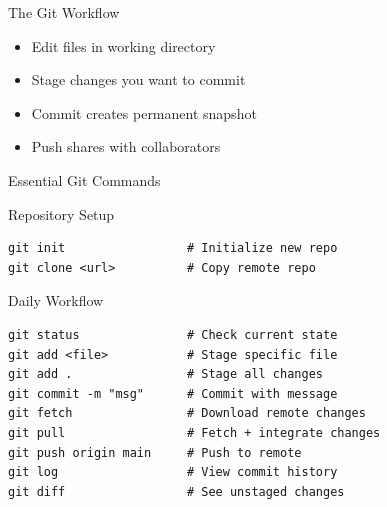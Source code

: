 \documentclass[11pt,aspectratio=169]{beamer}
\begin{document}
\begin{frame}{The Git Workflow}
\begin{center}
\end{center}

\vspace{0.3cm}
\begin{itemize}
    \item Edit files in working directory
    \item Stage changes you want to commit
    \item Commit creates permanent snapshot
    \item Push shares with collaborators
\end{itemize}
\end{frame}


\begin{frame}[fragile]{Essential Git Commands}
\begin{block}{Repository Setup}
\begin{verbatim}
git init                 # Initialize new repo
git clone <url>          # Copy remote repo
\end{verbatim}
\end{block}

\begin{block}{Daily Workflow}
\begin{verbatim}
git status               # Check current state
git add <file>           # Stage specific file
git add .                # Stage all changes
git commit -m "msg"      # Commit with message
git fetch                # Download remote changes
git pull                 # Fetch + integrate changes
git push origin main     # Push to remote
git log                  # View commit history
git diff                 # See unstaged changes
\end{verbatim}
\end{block}
\end{frame}
\end{document}
